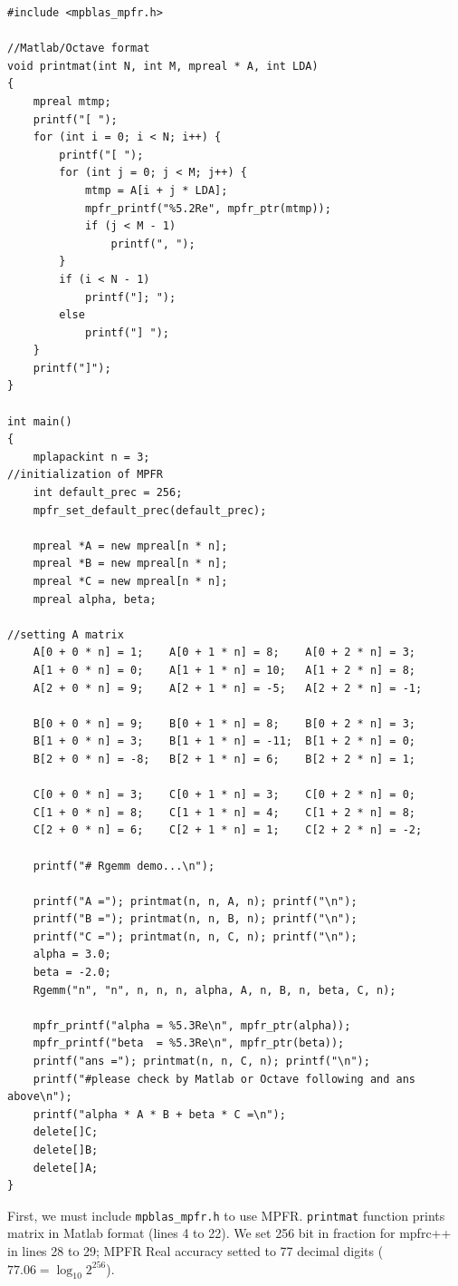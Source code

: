 \documentclass[12pt]{article}
\begin{document}
\begin{lstlisting}
#include <mpblas_mpfr.h>

//Matlab/Octave format
void printmat(int N, int M, mpreal * A, int LDA)
{
    mpreal mtmp;
    printf("[ ");
    for (int i = 0; i < N; i++) {
        printf("[ ");
        for (int j = 0; j < M; j++) {
            mtmp = A[i + j * LDA];
            mpfr_printf("%5.2Re", mpfr_ptr(mtmp));
            if (j < M - 1)
                printf(", ");
        }
        if (i < N - 1)
            printf("]; ");
        else
            printf("] ");
    }
    printf("]");
}

int main()
{
    mplapackint n = 3;
//initialization of MPFR
    int default_prec = 256;
    mpfr_set_default_prec(default_prec);

    mpreal *A = new mpreal[n * n];
    mpreal *B = new mpreal[n * n];
    mpreal *C = new mpreal[n * n];
    mpreal alpha, beta;

//setting A matrix
    A[0 + 0 * n] = 1;    A[0 + 1 * n] = 8;    A[0 + 2 * n] = 3;
    A[1 + 0 * n] = 0;    A[1 + 1 * n] = 10;   A[1 + 2 * n] = 8;
    A[2 + 0 * n] = 9;    A[2 + 1 * n] = -5;   A[2 + 2 * n] = -1;

    B[0 + 0 * n] = 9;    B[0 + 1 * n] = 8;    B[0 + 2 * n] = 3;
    B[1 + 0 * n] = 3;    B[1 + 1 * n] = -11;  B[1 + 2 * n] = 0;
    B[2 + 0 * n] = -8;   B[2 + 1 * n] = 6;    B[2 + 2 * n] = 1;

    C[0 + 0 * n] = 3;    C[0 + 1 * n] = 3;    C[0 + 2 * n] = 0;
    C[1 + 0 * n] = 8;    C[1 + 1 * n] = 4;    C[1 + 2 * n] = 8;
    C[2 + 0 * n] = 6;    C[2 + 1 * n] = 1;    C[2 + 2 * n] = -2;

    printf("# Rgemm demo...\n");

    printf("A ="); printmat(n, n, A, n); printf("\n");
    printf("B ="); printmat(n, n, B, n); printf("\n");
    printf("C ="); printmat(n, n, C, n); printf("\n");
    alpha = 3.0;
    beta = -2.0;
    Rgemm("n", "n", n, n, n, alpha, A, n, B, n, beta, C, n);

    mpfr_printf("alpha = %5.3Re\n", mpfr_ptr(alpha));
    mpfr_printf("beta  = %5.3Re\n", mpfr_ptr(beta));
    printf("ans ="); printmat(n, n, C, n); printf("\n");
    printf("#please check by Matlab or Octave following and ans above\n");
    printf("alpha * A * B + beta * C =\n");
    delete[]C;
    delete[]B;
    delete[]A;
}
\end{lstlisting}
First, we must include {\tt mpblas\_mpfr.h} to use MPFR. {\tt printmat} function prints matrix in Matlab format (lines 4 to 22). 
We set 256 bit in fraction for mpfrc++ in lines 28 to 29; MPFR Real accuracy setted to  77 decimal digits ($77.06 = \log_{10} 2^{256}$).
\end{document}
